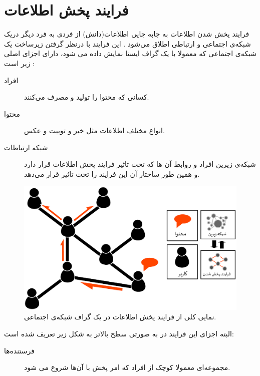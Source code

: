 \section{فرایند پخش اطلاعات}
\begin {persian}
\noindent
فرایند پخش شدن اطلاعات به جابه جایی اطلاعات(دانش) از فردی به فرد دیگر در‌یک شبکه‌ی اجتماعی و ارتباطی اطلاق می‌شود \cite{zafarani_social_2014}. این فرایند با درنظر گرفتن زیرساخت یک شبکه‌ی اجتماعی که معمولا با یک گراف ایستا نمایش داده می شود، دارای اجزای اصلی زیر است \cite{wu_dynamics_2013}:
\begin{description}

\item[افراد]{کسانی که محتوا را تولید و مصرف می‌کنند.}

\item[محتوا]{انواع مختلف اطلاعات مثل خبر و توییت و عکس.}
 
\item[شبکه ارتباطات]{شبکه‌ی زیرین افراد و روابط آن ‌‌ها که تحت تاثیر فرایند پخش اطلاعات قرار دارد و همین طور ساختار آن این فرایند را تحت تاثیر قرار می‌دهد.}
 
\end{description}
 \begin{figure}[H]
 \centering
 \includegraphics[scale=0.23]{figures/diffusion1}
 \caption[فرایند پخش اطلاعات در ‌یک گراف]
 {نمایی کلی از فرایند پخش اطلاعات در ‌یک گراف شبکه‌ی اجتماعی.}
\end{figure}

البته اجزای این فرایند در \cite{zafarani_social_2014} به صورتی سطح بالاتر به شکل زیر تعریف شده است:
\begin{description}

\item[فرستنده‌ها]{مجموعه‌ای معمولا کوچک از افراد که امر پخش با آن‌ها شروع می شود.}


\end{description}
\end{persian}
